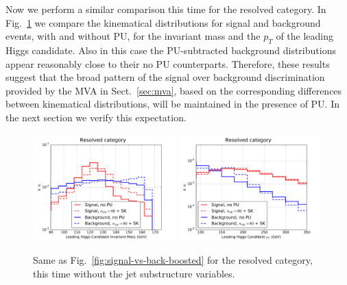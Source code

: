 Now we perform a similar comparison this time for
the resolved category.
%
In Fig.~\ref{fig:signal-vs-back-resolved} we compare
the kinematical distributions for signal and background events,
     with and without PU, for the invariant mass and the $p_T$ of the leading
     Higgs candidate.
     Also in this
     case the PU-subtracted background distributions appear reasonably close
     to their no PU counterparts.
     Therefore, these results
     suggest that the broad pattern of the signal over background
     discrimination provided by the MVA in Sect.~\ref{sec:mva},
     based on the corresponding differences between kinematical
     distributions,
will
     be maintained in the presence of PU.
     In the next section we verify this expectation.


\begin{figure}[t]
  \begin{center}
   \includegraphics[width=0.49\textwidth]{plots/m_h0_res_comp_back.pdf}
  \includegraphics[width=0.49\textwidth]{plots/pt_h0_res_comp_back.pdf}
     \caption{\small
       Same as Fig.~\ref{fig:signal-vs-back-boosted} for the resolved category,
       this time without the jet substructure variables.
}
\label{fig:signal-vs-back-resolved}
\end{center}
\end{figure}
